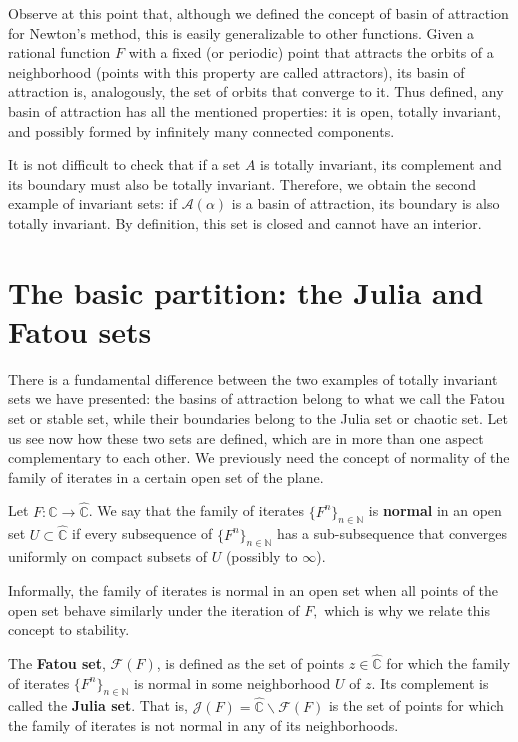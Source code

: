 \documentclass[12pt, a4paper]{article}
\begin{document}
Observe at this point that, although we defined the concept of basin of
attraction for Newton's method, this is easily generalizable to other functions.
Given a rational function $F$ with a fixed (or periodic) point that attracts the
orbits of a neighborhood (points with this property are called attractors), its
basin of attraction is, analogously, the set of orbits that converge to it. Thus
defined, any basin of attraction has all the mentioned properties: it is open,
totally invariant, and possibly formed by infinitely many connected components.

It is not difficult to check that if a set $A$ is totally invariant, its
complement and its boundary must also be totally invariant. Therefore, we obtain
the second example of invariant sets: if $\mathcal{A}(\alpha)$ is a basin of
attraction, its boundary is also totally invariant. By definition, this set is
closed and cannot have an interior.

\section{The basic partition: the Julia and Fatou sets}

There is a fundamental difference between the two examples of totally invariant
sets we have presented: the basins of attraction belong to what we call the
Fatou set or stable set, while their boundaries belong to the Julia set or
chaotic set. Let us see now how these two sets are defined, which are in more
than one aspect complementary to each other. We previously need the concept of
normality of the family of iterates in a certain open set of the plane.

\begin{definition}
Let $F:\hat{\mathbb{C}}\rightarrow\hat{\mathbb{C}}$. We say that the family of
iterates $\{F^{n}\}_{n\in\mathbb{N}}$ is \textbf{normal} in an open set
$U\subset\hat{\mathbb{C}}$ if every subsequence of $\{F^{n}\}_{n\in\mathbb{N}}$
has a sub-subsequence that converges uniformly on compact subsets of $U$
(possibly to $\infty$).
\end{definition}

Informally, the family of iterates is normal in an open set when all points of
the open set behave similarly under the iteration of $F, $ which is why we
relate this concept to stability.

\begin{definition}
The \textbf{Fatou set}, $\mathcal{F}(F)$, is defined as the set of points
$z\in\hat{\mathbb{C}}$ for which the family of iterates
$\{F^{n}\}_{n\in\mathbb{N}}$ is normal in some neighborhood $U$ of $z$. Its
complement is called the \textbf{Julia set}. That is,
$\mathcal{J}(F)=\hat{\mathbb{C}}\backslash\mathcal{F}(F)$ is the set of points
for which the family of iterates is not normal in any of its neighborhoods.
\end{definition}
\end{document}
